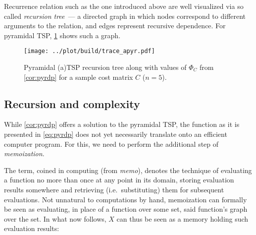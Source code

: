 \documentclass[index=totoc,bibliography=totoc]{scrartcl}
\numberwithin{equation}{section}
\numberwithin{figure}{section}
\numberwithin{table}{section}
\let\defstyle\itshape
\begin{document}
Recurrence relation such as the one introduced above are well visualized
via so called {\defstyle recursion tree}~--- a directed graph in which
nodes correspond to different arguments to the relation, and edges
represent recursive dependence.  For pyramidal TSP, \cref{fig:pyratrace}
shows such a graph.

\begin{figure}[htbp]
  \centering
  \texttt{[image: ../plot/build/trace\_apyr.pdf]}
\caption{Pyramidal (a)TSP recursion tree along with values of $\Phi_C$
  from \cref{cor:pyrdp} for a sample cost matrix $C$ ($n=5$).}
\label{fig:pyratrace}
\end{figure}


\subsection{Recursion and complexity}

While \cref{cor:pyrdp} offers a solution to the pyramidal TSP, the function
as it is presented in \cref{eq:pyrdp} does not yet necessarily translate
onto an efficient computer program.
For this, we need to perform the additional step of {\defstyle memoization}.

The term, coined in computing (from {\defstyle memo}), denotes the
technique of evaluating a function no more than once at any point in its domain,
storing evaluation results somewhere and retrieving (i.e.\ substituting) them for
subsequent evaluations.
Not unnatural to computations by hand, memoization can formally be seen as
evaluating, in place of a function over some set, said function's graph over
the set.
In what now follows, $X$ can thus be seen as a memory holding such evaluation results:
\end{document}
